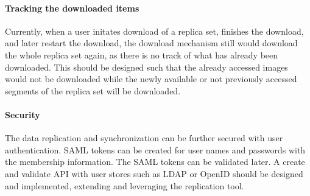 \documentclass[conference]{IEEEtran}
\begin{document}
\paragraph*{Tracking the downloaded items}
Currently, when a user initates download of a replica set, finishes the download, and later restart the download, the download mechanism still would download the whole replica set again, as there is no track of what has already been downloaded. This should be designed such that the already accessed images would not be downloaded while the newly available or not previously accessed segments of the replica set will be downloaded. 
\paragraph*{Security}
The data replication and synchronization can be further secured with user authentication. SAML tokens can be created for user names and passwords with the membership information. The SAML tokens can be validated later. A create and validate API with user stores such as LDAP or OpenID should be designed and implemented, extending and leveraging the replication tool.


\end{document}
